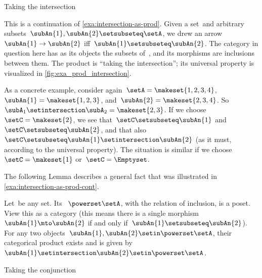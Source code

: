 \begin{marginfigure}
    \centering
    \caption{Taking the intersection}
    \label{fig:exa_prod_intersection_cont}
\end{marginfigure}

\begin{example}
    \label{exa:intersection-as-prod-cont}
    This is a continuation of \cref{exa:intersection-as-prod}.
    Given a set~\setA and arbitrary subsets~$\subAn{1}, \subAn{2} \setsubseteq \setA$, we drew an arrow~$\subAn{1} \to \subAn{2}$ iff~$\subAn{1} \setsubseteq \subAn{2}$.
    The category in question here has as its objects the subsets of~\setA, and its morphisms are inclusions between them.
    The product is ``taking the intersection''; its universal property is visualized in \cref{fig:exa_prod_intersection}.

    As a concrete example, consider again~$\setA = \makeset{ 1, 2, 3, 4 }$,~$\subAn{1} = \makeset{ 1, 2, 3 }$, and~$\subAn{2} = \makeset{2, 3, 4 }$.
    So~$\subA_1 \setintersection \subA_2 = \makeset{2, 3 }$.
    If we choose~$\setC = \makeset{ 2 }$, we see that~$\setC \setsubseteq \subAn{1}$ and~$\setC \setsubseteq \subAn{2}$, and that also~$\setC \setsubseteq \subAn{1} \setintersection \subAn{2}$ (as it must, according to the universal property).
    The situation is similar if we choose~$\setC = \makeset{ 1}$ or~$\setC = \Emptyset$.
\end{example}

The following Lemma describes a general fact that was illustrated in \cref{exa:intersection-as-prod-cont}.
\begin{lemma}
    \label{lem:cat-product-powerset}
    Let~\setA be any set.
    Its ~$\powerset \setA$, with the relation of inclusion, is a poset.
    View this  as a category (this means there is a single morphism~$\subAn{1} \mto \subAn{2}$ if and only if~$\subAn{1} \setsubseteq \subAn{2}$).
    For any two objects~$\subAn{1}, \subAn{2} \setin \powerset \setA$, their categorical product exists and is given by~$\subAn{1} \setintersection \subAn{2} \setin \powerset \setA$.
\end{lemma}

\begin{marginfigure}
    \centering
    \caption{Taking the conjunction}
    \label{fig:exa_prod_conjunction_cont}
\end{marginfigure}

